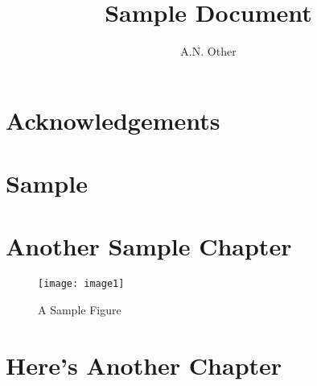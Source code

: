 \documentclass{book}
\title{Sample Document}
\author{A.N. Other}
\begin{document}
\raggedright
\maketitle

\frontmatter
\tableofcontents
\chapter{Acknowledgements}

\lipsum[1]

%
%
%

\mainmatter
\chapter{Sample}

%
\renewcommand{\ffprechapterhook}{%
  \flowswitchoffnextoddonly*{left,right}%
  \flowswitchonnextoddonly*{shortleft,shortright}%
  \dynamicswitchonnextoddonly*{title}%
}

\lipsum

\lipsum

\chapter{Another Sample Chapter}

\lipsum[1-20]



\clearpage

\begin{figure}[p]
\centering
 \texttt{[image: image1]}
\caption{A Sample Figure}
\label{fig:sample}
\end{figure}

\clearpage

\lipsum[21-30]

\chapter{Here's Another Chapter}

\lipsum[1-20]




\lipsum[21-40]
\end{document}

